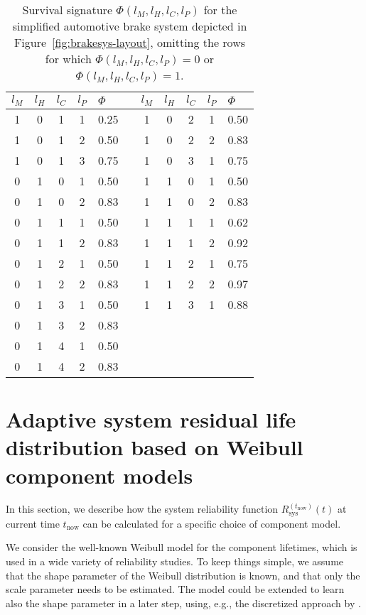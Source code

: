 \documentclass[authoryear]{elsarticle}
\def\tnow{t_\text{now}}
\newcommand{\Rsysnow}{R^{(t_\text{now})}_\text{sys}}
\begin{document}
\begin{table}
\centering
\begin{tabular}{cccclcccccl}
  \toprule
$l_M$ & $l_H$ & $l_C$ & $l_P$ & $\Phi$ & \quad & $l_M$ & $l_H$ & $l_C$ & $l_P$ & $\Phi$\\ 
  \midrule
1 & 0 & 1 & 1 & 0.25 & & 1 & 0 & 2 & 1 & 0.50 \\ 
1 & 0 & 1 & 2 & 0.50 & & 1 & 0 & 2 & 2 & 0.83 \\ 
1 & 0 & 1 & 3 & 0.75 & & 1 & 0 & 3 & 1 & 0.75 \\ 
0 & 1 & 0 & 1 & 0.50 & & 1 & 1 & 0 & 1 & 0.50 \\ 
0 & 1 & 0 & 2 & 0.83 & & 1 & 1 & 0 & 2 & 0.83 \\ 
0 & 1 & 1 & 1 & 0.50 & & 1 & 1 & 1 & 1 & 0.62 \\ 
0 & 1 & 1 & 2 & 0.83 & & 1 & 1 & 1 & 2 & 0.92 \\ 
0 & 1 & 2 & 1 & 0.50 & & 1 & 1 & 2 & 1 & 0.75 \\ 
0 & 1 & 2 & 2 & 0.83 & & 1 & 1 & 2 & 2 & 0.97 \\ 
0 & 1 & 3 & 1 & 0.50 & & 1 & 1 & 3 & 1 & 0.88 \\ 
0 & 1 & 3 & 2 & 0.83 \\
0 & 1 & 4 & 1 & 0.50 \\
0 & 1 & 4 & 2 & 0.83 \\
   \bottomrule
\end{tabular}
\caption{Survival signature $\Phi(l_M, l_H, l_C, l_P)$
for the simplified automotive brake system depicted in Figure~\ref{fig:brakesys-layout},
omitting the rows for which $\Phi(l_M, l_H, l_C, l_P) = 0$ or $\Phi(l_M, l_H, l_C, l_P) = 1$.}
\label{tab:brakesys-survsign}
\end{table}


\section{Adaptive system residual life distribution based on Weibull component models}
\label{sec:adaptive-sysrel-weibull}

In this section, we describe how the system reliability function $\Rsysnow(t)$ at current time $\tnow$ 
can be calculated for a specific choice of component model.

We consider the well-known Weibull model for the component lifetimes,
which is used in a wide variety of reliability studies. 
To keep things simple, we assume that the shape parameter of the Weibull distribution is known,
and that only the scale parameter needs to be estimated.
The model could be extended to learn also the shape parameter in a later step,
using, e.g., the discretized approach by \cite{1969:soland}.
\end{document}
